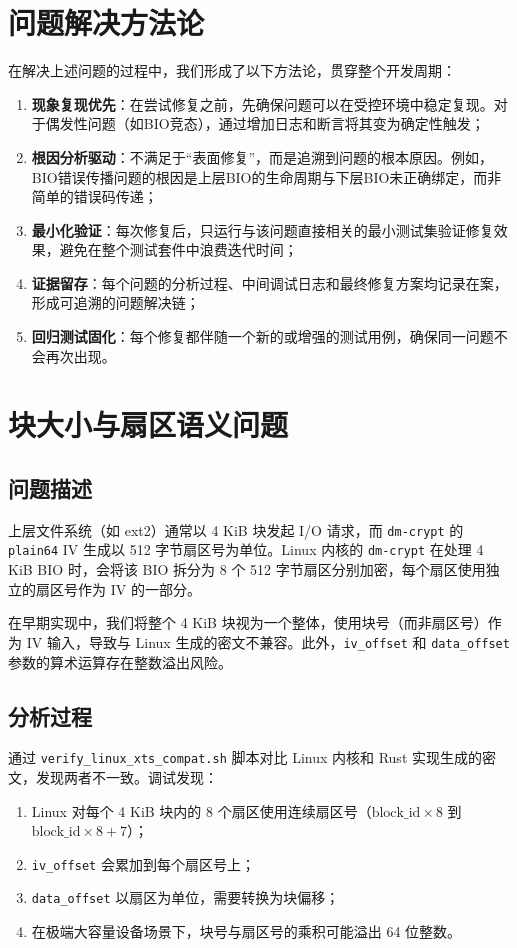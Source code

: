 \section{问题解决方法论}

在解决上述问题的过程中，我们形成了以下方法论，贯穿整个开发周期：

\begin{enumerate}
    \item \textbf{现象复现优先}：在尝试修复之前，先确保问题可以在受控环境中稳定复现。对于偶发性问题（如BIO竞态），通过增加日志和断言将其变为确定性触发；
    \item \textbf{根因分析驱动}：不满足于“表面修复”，而是追溯到问题的根本原因。例如，BIO错误传播问题的根因是上层BIO的生命周期与下层BIO未正确绑定，而非简单的错误码传递；
    \item \textbf{最小化验证}：每次修复后，只运行与该问题直接相关的最小测试集验证修复效果，避免在整个测试套件中浪费迭代时间；
    \item \textbf{证据留存}：每个问题的分析过程、中间调试日志和最终修复方案均记录在案，形成可追溯的问题解决链；
    \item \textbf{回归测试固化}：每个修复都伴随一个新的或增强的测试用例，确保同一问题不会再次出现。
\end{enumerate}

\section{块大小与扇区语义问题}

\subsection{问题描述}

上层文件系统（如 ext2）通常以 4 KiB 块发起 I/O 请求，而 \texttt{dm-crypt} 的 \texttt{plain64} IV 生成以 512 字节扇区号为单位。Linux 内核的 \texttt{dm-crypt} 在处理 4 KiB BIO 时，会将该 BIO 拆分为 8 个 512 字节扇区分别加密，每个扇区使用独立的扇区号作为 IV 的一部分。

在早期实现中，我们将整个 4 KiB 块视为一个整体，使用块号（而非扇区号）作为 IV 输入，导致与 Linux 生成的密文不兼容。此外，\texttt{iv\_offset} 和 \texttt{data\_offset} 参数的算术运算存在整数溢出风险。

\subsection{分析过程}

通过 \texttt{verify\_linux\_xts\_compat.sh} 脚本对比 Linux 内核和 Rust 实现生成的密文，发现两者不一致。调试发现：
\begin{enumerate}
    \item Linux 对每个 4 KiB 块内的 8 个扇区使用连续扇区号（$\text{block\_id} \times 8$ 到 $\text{block\_id} \times 8 + 7$）；
    \item \texttt{iv\_offset} 会累加到每个扇区号上；
    \item \texttt{data\_offset} 以扇区为单位，需要转换为块偏移；
    \item 在极端大容量设备场景下，块号与扇区号的乘积可能溢出 64 位整数。
\end{enumerate}


